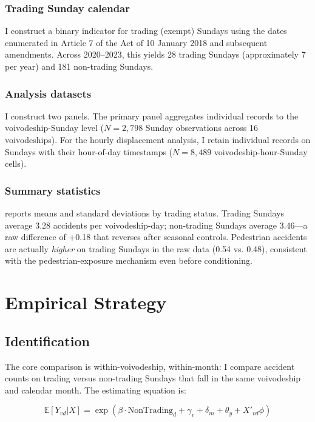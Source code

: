 \documentclass[12pt]{article}
\newcommand{\E}{\mathbb{E}}
\begin{document}
\subsubsection*{Trading Sunday calendar} I construct a binary indicator for trading (exempt) Sundays using the dates enumerated in Article 7 of the Act of 10 January 2018 and subsequent amendments. Across 2020--2023, this yields 28 trading Sundays (approximately 7 per year) and 181 non-trading Sundays.

\subsubsection*{Analysis datasets} I construct two panels. The primary panel aggregates individual records to the voivodeship-Sunday level ($N = 2{,}798$ Sunday observations across 16 voivodeships). For the hourly displacement analysis, I retain individual records on Sundays with their hour-of-day timestamps ($N = 8{,}489$ voivodeship-hour-Sunday cells).

\subsubsection*{Summary statistics}  reports means and standard deviations by trading status. Trading Sundays average 3.28 accidents per voivodeship-day; non-trading Sundays average 3.46---a raw difference of +0.18 that reverses after seasonal controls. Pedestrian accidents are actually \textit{higher} on trading Sundays in the raw data (0.54 vs. 0.48), consistent with the pedestrian-exposure mechanism even before conditioning.




\section{Empirical Strategy}
\label{sec:strategy}

\subsection{Identification}

The core comparison is within-voivodeship, within-month: I compare accident counts on trading versus non-trading Sundays that fall in the same voivodeship and calendar month. The estimating equation is:

\begin{equation}
\E[Y_{vd} | X] = \exp\left(\beta \cdot \text{NonTrading}_d + \gamma_v + \delta_m + \theta_y + X'_{vd}\phi\right)
\label{eq:main}
\end{equation}
\end{document}
